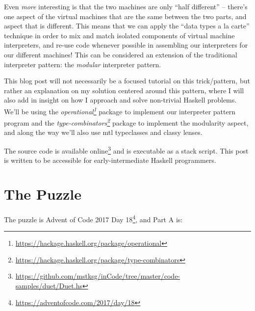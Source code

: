 \documentclass[]{article}
\renewcommand{\href}[2]{#2\footnote{\url{#1}}}
\begin{document}
Even \emph{more} interesting is that the two machines are only ``half
different'' -- there's one aspect of the virtual machines that are the same
between the two parts, and aspect that is different. This means that we can
apply the ``data types a la carte'' technique in order to mix and match isolated
components of virtual machine interpreters, and re-use code whenever possible in
assembling our interpreters for our different machines! This can be considered
an extension of the traditional interpreter pattern: the \emph{modular}
interpreter pattern.

This blog post will not necessarily be a focused tutorial on this trick/pattern,
but rather an explanation on my solution centered around this pattern, where I
will also add in insight on how I approach and solve non-trivial Haskell
problems. We'll be using the
\emph{\href{https://hackage.haskell.org/package/operational}{operational}}
package to implement our interpreter pattern program and the
\emph{\href{https://hackage.haskell.org/package/type-combinators}{type-combinators}}
package to implement the modularity aspect, and along the way we'll also use mtl
typeclasses and classy lenses.

The source code is
\href{https://github.com/mstksg/inCode/tree/master/code-samples/duet/Duet.hs}{available
online} and is executable as a stack script. This post is written to be
accessible for early-intermediate Haskell programmers.

\section{The Puzzle}\label{the-puzzle}

The puzzle is \href{https://adventofcode.com/2017/day/18}{Advent of Code 2017
Day 18}, and Part A is:
\end{document}

